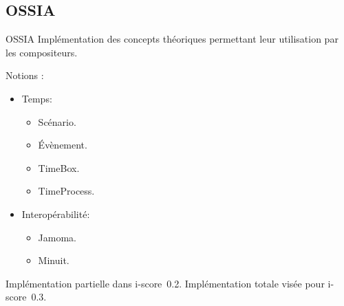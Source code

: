 \subsection{OSSIA}
\begin{frame}{OSSIA}
	Implémentation des concepts théoriques permettant leur utilisation par les compositeurs.
	
	Notions : 
	\begin{itemize}
		\item{Temps:
		\begin{itemize}
			\item Scénario.
			\item Évènement.
			\item TimeBox.
			\item TimeProcess.
		\end{itemize}
		}
		
		\item{Interopérabilité:
		\begin{itemize}
			\item Jamoma.
			\item Minuit.
		\end{itemize}
	}
	\end{itemize}
	
	\begin{itemize}
		\itemar Implémentation partielle dans i-score~0.2.
		\itemar Implémentation totale visée pour i-score~0.3.
	\end{itemize}
\end{frame}